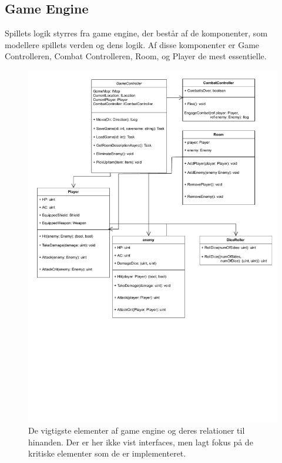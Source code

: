 \subsection{Game Engine}
\label{sec:GameEngineDesign}

\noindent Spillets logik styrres fra game engine, der består
af de komponenter, som modellere spillets verden og dens 
logik. Af disse komponenter er Game Controlleren, Combat Controlleren,
Room, og Player de mest essentielle.

\begin{figure}[H]
  \centering
  \includegraphics[width=\textwidth, trim = 0 9cm 0 0]{02-Body/Images/CoreClassDiagram.pdf}
  \caption{De vigtigste elementer af game engine og deres 
           relationer til hinanden. Der er her ikke vist 
           interfaces, men lagt fokus på de kritiske elementer
           som de er implementeret.}%
  \label{fig:CoreDiagram}
\end{figure}


